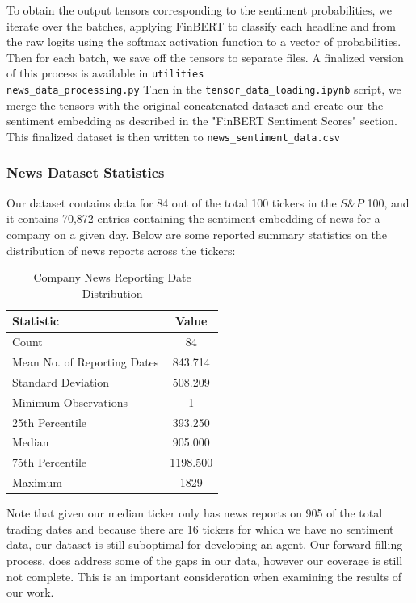 To obtain the output tensors corresponding to the sentiment probabilities, we iterate over the batches, applying FinBERT to classify each headline and from the raw logits using the softmax activation function to a vector of probabilities.
Then for each batch, we save off the tensors to separate files. A finalized version of this process is available in \texttt{utilities\\news\_data\_processing.py}
Then in the \texttt{tensor\_data\_loading.ipynb} script, we merge the tensors with the original concatenated dataset and create our the sentiment embedding as described in the "FinBERT Sentiment Scores" section. 
This finalized dataset is then written to \texttt{news\_sentiment\_data.csv}

\subsubsection{News Dataset Statistics}\label{newsstats}

Our dataset contains data for 84 out of the total 100 tickers in the $S\&P$ 100, and it contains 70,872 entries containing the sentiment embedding of news for a company on a given day. Below are some reported summary statistics on the distribution of news reports across the tickers:

\begin{table}[htbp]
    \centering
    \caption{Company News Reporting Date Distribution}
    \begin{tabular}{l c}
        \toprule
        \textbf{Statistic} & \textbf{Value} \\
        \midrule
        Count & 84 \\
        Mean No. of Reporting Dates & 843.714 \\
        Standard Deviation & 508.209 \\
        Minimum Observations & 1 \\
        25th Percentile & 393.250 \\
        Median & 905.000 \\
        75th Percentile & 1198.500 \\
        Maximum & 1829 \\
        \bottomrule
    \end{tabular}
\end{table}

Note that given our median ticker only has news reports on 905 of the total trading dates and because there are 16 tickers for which we have no sentiment data, our dataset is still suboptimal for developing an agent. Our forward filling process, does address some of the gaps in our data, however our coverage is still not complete.
This is an important consideration when examining the results of our work.

